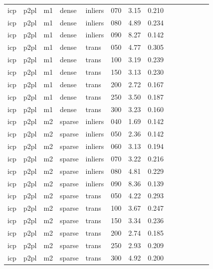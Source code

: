\begin{table}[htbp]
\begin{tabular}{llllllrrrrrrrr}
  icp & p2pl & m1 & dense & inliers & 070 & 3.15 & 0.210 \\
  icp & p2pl & m1 & dense & inliers & 080 & 4.89 & 0.234 \\
  icp & p2pl & m1 & dense & inliers & 090 & 8.27 & 0.142 \\
  icp & p2pl & m1 & dense & trans & 050 & 4.77 & 0.305 \\
  icp & p2pl & m1 & dense & trans & 100 & 3.19 & 0.239 \\
  icp & p2pl & m1 & dense & trans & 150 & 3.13 & 0.230 \\
  icp & p2pl & m1 & dense & trans & 200 & 2.72 & 0.167 \\
  icp & p2pl & m1 & dense & trans & 250 & 3.50 & 0.187 \\
  icp & p2pl & m1 & dense & trans & 300 & 3.23 & 0.160 \\
  icp & p2pl & m2 & sparse & inliers & 040 & 1.69 & 0.142 \\
  icp & p2pl & m2 & sparse & inliers & 050 & 2.36 & 0.142 \\
  icp & p2pl & m2 & sparse & inliers & 060 & 3.13 & 0.194 \\
  icp & p2pl & m2 & sparse & inliers & 070 & 3.22 & 0.216 \\
  icp & p2pl & m2 & sparse & inliers & 080 & 4.81 & 0.229 \\
  icp & p2pl & m2 & sparse & inliers & 090 & 8.36 & 0.139 \\
  icp & p2pl & m2 & sparse & trans & 050 & 4.22 & 0.293 \\
  icp & p2pl & m2 & sparse & trans & 100 & 3.67 & 0.247 \\
  icp & p2pl & m2 & sparse & trans & 150 & 3.34 & 0.236 \\
  icp & p2pl & m2 & sparse & trans & 200 & 2.74 & 0.185 \\
  icp & p2pl & m2 & sparse & trans & 250 & 2.93 & 0.209 \\
  icp & p2pl & m2 & sparse & trans & 300 & 4.92 & 0.200 \\
\bottomrule
\end{tabular}
\end{table}
